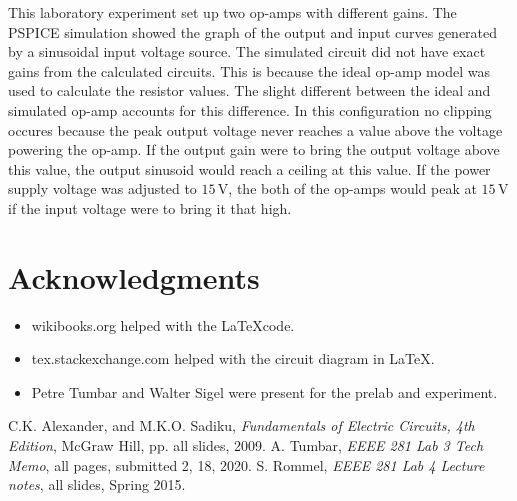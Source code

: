 \documentclass[11pt]{article}
\begin{document}
This laboratory experiment set up two op-amps with different gains. The PSPICE simulation showed the graph of the output and input curves generated by a sinusoidal input voltage source. The simulated circuit did not have exact gains from the calculated circuits. This is because the ideal op-amp model was used to calculate the resistor values. The slight different between the ideal and simulated op-amp accounts for this difference. In this configuration no clipping occures because the peak output voltage never reaches a value above the voltage powering the op-amp. If the output gain were to bring the output voltage above this value, the output sinusoid would reach a ceiling at this value. If the power supply voltage was adjusted to $15\,\si\volt$, the both of the op-amps would peak at $15\,\si\volt$ if the input voltage were to bring it that high.



\section{Acknowledgments}

\begin{itemize}
	\item wikibooks.org helped with the \LaTeX\;code.
	\item tex.stackexchange.com helped with the circuit diagram in \LaTeX.
	\item Petre Tumbar and Walter Sigel were present for the prelab and experiment.
\end{itemize}

\begin{thebibliography}{9}
	C.K. Alexander, and M.K.O. Sadiku,
	\emph{Fundamentals of Electric Circuits, 4th Edition},
	McGraw Hill, pp. all slides, 2009.
A. Tumbar,
	\emph{EEEE 281 Lab 3 Tech Memo},
	all pages, submitted 2, 18, 2020.
	S. Rommel,
	\emph{EEEE 281 Lab 4 Lecture notes},
	all slides, Spring 2015.
\end{thebibliography}
\end{document}
